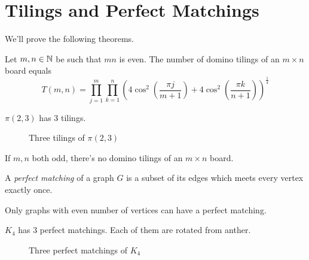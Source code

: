 \section{Tilings and Perfect Matchings}
We'll prove the following theorems.
\begin{theorem}[Kasteleyn (1961)]
Let \(m,n\in\mathbb{N}\) be such that \(mn\) is even.
The number of domino tilings of an \(m\times n\) board equals
\[ T(m,n)=\prod_{j=1}^{m}\prod_{k=1}^n \left(4\cos^2\left(\frac{\pi j}{m+1}\right) + 4\cos^2\left(\frac{\pi k}{n+1}\right)\right)^{\frac{1}{4}} \]
\end{theorem}
\begin{example}
\(\pi(2,3)\) has 3 tilings.
\begin{figure}[h]
    \caption{Three tilings of \(\pi(2,3)\)}
\end{figure}
\end{example}
\begin{remark}
If \(m,n\) both odd, there's no domino tilings of an \(m\times n\) board.
\end{remark}


\begin{definition}
A \emph{perfect matching} of a graph \(G\) is a subset of its edges which meets every vertex exactly once.
\end{definition}
\begin{remark}
Only graphs with even number of vertices can have a perfect matching.
\end{remark}
\begin{example}
\(K_4\) has 3 perfect matchings. Each of them are rotated from anther.
\begin{figure}[h]
    \caption{Three perfect matchings of \(K_4\)}
\end{figure}
\end{example}